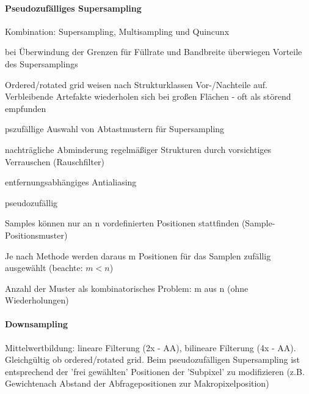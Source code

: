 \documentclass[landscape]{article}
\begin{document}
\begin{multicols}{3}
  \paragraph{Pseudozufälliges Supersampling}
  \begin{itemize*}
      \item Kombination: Supersampling, Multisampling und Quincunx
      \item bei Überwindung der Grenzen für Füllrate und Bandbreite überwiegen Vorteile des Supersamplings
      \item Ordered/rotated grid weisen nach Strukturklassen Vor-/Nachteile auf. Verbleibende Artefakte wiederholen sich bei großen Flächen - oft als störend empfunden
      \item pszufällige Auswahl von Abtastmustern für Supersampling
      \item nachträgliche Abminderung regelmäßiger Strukturen durch vorsichtiges Verrauschen (Rauschfilter)
      \item entfernungsabhängiges Antialiasing
    \item pseudozufällig
    \begin{itemize*}
      \item Samples können nur an n vordefinierten Positionen stattfinden (Sample-Positionsmuster)
      \item Je nach Methode werden daraus m Positionen für das Samplen zufällig ausgewählt (beachte: $m < n$)
      \item Anzahl der Muster als kombinatorisches Problem: m aus n (ohne Wiederholungen)
    \end{itemize*}
  \end{itemize*}
  
  \paragraph{Downsampling}
  Mittelwertbildung: lineare Filterung (2x - AA), bilineare Filterung (4x - AA). Gleichgültig ob ordered/rotated grid. 
  Beim pseudozufälligen Supersampling ist entsprechend der 'frei gewählten' Positionen der 'Subpixel' zu modifizieren (z.B. Gewichtenach Abstand der Abfragepositionen zur Makropixelposition)
  

\end{multicols}
\end{document}

